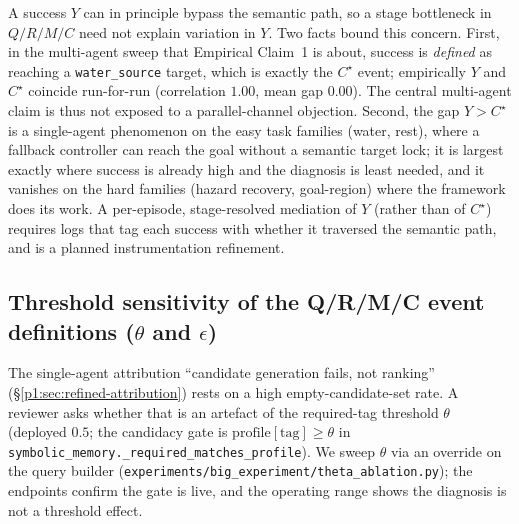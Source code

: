 \documentclass{article}
\newcommand{\method}[1]{\texttt{#1}}
\begin{document}
A success $Y$ can in principle bypass the semantic path, so a stage bottleneck in $Q/R/M/C$ need not explain variation in $Y$. Two facts bound this concern. First, in the multi-agent sweep that Empirical Claim~1 is about, success is \emph{defined} as reaching a \texttt{water\_source} target, which is exactly the $C^\star$ event; empirically $Y$ and $C^\star$ coincide run-for-run (correlation $1.00$, mean gap $0.00$). The central multi-agent claim is thus not exposed to a parallel-channel objection. Second, the gap $Y>C^\star$ is a single-agent phenomenon on the easy task families (water, rest), where a fallback controller can reach the goal without a semantic target lock; it is largest exactly where success is already high and the diagnosis is least needed, and it vanishes on the hard families (hazard recovery, goal-region) where the framework does its work. A per-episode, stage-resolved mediation of $Y$ (rather than of $C^\star$) requires logs that tag each success with whether it traversed the semantic path, and is a planned instrumentation refinement.

\subsection{Threshold sensitivity of the Q/R/M/C event definitions ($\theta$ and $\epsilon$)}
\label{p1:app:theta-robustness}

The single-agent attribution ``candidate generation fails, not ranking''
(\S\ref{p1:sec:refined-attribution}) rests on a high empty-candidate-set rate. A
reviewer asks whether that is an artefact of the required-tag threshold
$\theta$ (deployed $0.5$; the candidacy gate is
$\mathrm{profile}[\text{tag}]\ge\theta$ in
\method{symbolic\_memory.\_required\_matches\_profile}). We sweep $\theta$ via an
override on the query builder (\method{experiments/big\_experiment/theta\_ablation.py});
the endpoints confirm the gate is live, and the operating range shows the
diagnosis is not a threshold effect.
\end{document}
